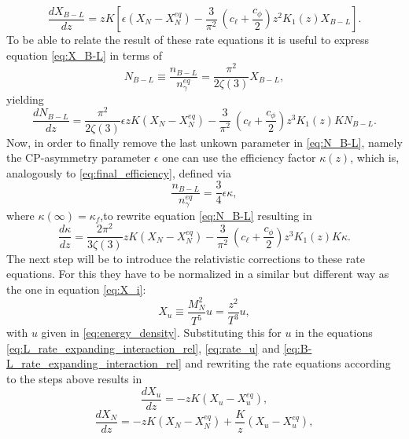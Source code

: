 \begin{equation}
\frac{dX_{B-L}}{dz}=zK\left[\epsilon\left(X_N-X_N^{eq}\right)-\frac{3}{\pi^2}\:\left(c_\ell+\frac{c_\phi}{2}\right)z^2K_1(z)X_{B-L}\right].
\label{eq:X_B-L}
\end{equation}
To be able to relate the result of these rate equations it is useful to express equation \eqref{eq:X_B-L} in terms of
\begin{equation}
	N_{B-L}\equiv\frac{n_{B-L}}{n_\gamma^{eq}}=\frac{\pi^2}{2\zeta(3)}X_{B-L},
\end{equation}
yielding
\begin{equation}
\frac{dN_{B-L}}{dz}=\frac{\pi^2}{2\zeta(3)}\epsilon zK\left(X_N-X_N^{eq}\right)-\frac{3}{\pi^2}\:\left(c_\ell+\frac{c_\phi}{2}\right)z^3K_1(z)KN_{B-L}.
\label{eq:N_B-L}
\end{equation}
Now, in order to finally remove the last unkown parameter in \eqref{eq:N_B-L}, namely the CP-asymmetry parameter $\epsilon$ one can use the efficiency factor $\kappa(z)$, which is, analogously to \eqref{eq:final_efficiency}, defined via
\begin{equation}
	\frac{n_{B-L}}{n_\gamma^{eq}}=\frac{3}{4}\epsilon\kappa,
	\label{eq:efficiency}
\end{equation} 
where $\kappa(\infty)=\kappa_f$,to rewrite equation \eqref{eq:N_B-L} resulting in
\begin{equation}
\frac{d\kappa}{dz}=\frac{2\pi^2}{3\zeta(3)}zK\left(X_N-X_N^{eq}\right)-\frac{3}{\pi^2}\:\left(c_\ell+\frac{c_\phi}{2}\right)z^3K_1(z)K\kappa.
\label{eq:kappa}
\end{equation}
The next step will be to introduce the relativistic corrections to these rate equations. For this they have to be normalized in a similar but different way as the one in equation \eqref{eq:X_i}\cite[Eq. (7.9)]{Wormann:2016yyi}:
\begin{equation}
	X_u\equiv\frac{M_N^2}{T^5}u=\frac{z^2}{T^3}u,
	\label{eq:X_u}
\end{equation}
with $u$ given in \eqref{eq:energy_density}.\newline \indent
Substituting this for $u$ in the equations \eqref{eq:L_rate_expanding_interaction_rel}, \eqref{eq:rate_u} and \eqref{eq:B-L_rate_expanding_interaction_rel} and rewriting the rate equations according to the steps above results in\cite[p. 47]{Wormann:2016yyi}
\begin{equation}
\frac{dX_u}{dz}=-zK\left(X_u-X_u^{eq}\right),
\end{equation}
\begin{equation}
\frac{dX_N}{dz}=-zK\left(X_N-X_N^{eq}\right)+\frac{K}{z}\left(X_u-X_u^{eq}\right),
\end{equation}
